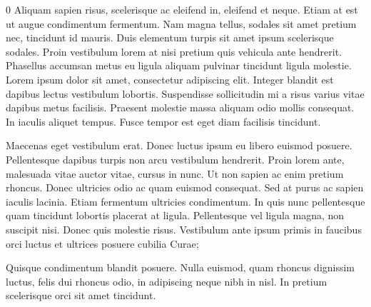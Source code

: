 \documentclass[a0]{a0poster}
\begin{document}
\framethin
\begin{area4}{0}
Aliquam sapien risus, scelerisque ac eleifend in, eleifend et neque. Etiam at est ut augue condimentum fermentum. Nam magna tellus, sodales sit amet pretium nec, tincidunt id mauris. Duis elementum turpis sit amet ipsum scelerisque sodales. Proin vestibulum lorem at nisi pretium quis vehicula ante hendrerit. Phasellus accumsan metus eu ligula aliquam pulvinar tincidunt ligula molestie. Lorem ipsum dolor sit amet, consectetur adipiscing elit. Integer blandit est dapibus lectus vestibulum lobortis. Suspendisse sollicitudin mi a risus varius vitae dapibus metus facilisis. Praesent molestie massa aliquam odio mollis consequat. In iaculis aliquet tempus. Fusce tempor est eget diam facilisis tincidunt.

Maecenas eget vestibulum erat. Donec luctus ipsum eu libero euismod posuere. Pellentesque dapibus turpis non arcu vestibulum hendrerit. Proin lorem ante, malesuada vitae auctor vitae, cursus in nunc. Ut non sapien ac enim pretium rhoncus. Donec ultricies odio ac quam euismod consequat. Sed at purus ac sapien iaculis lacinia. Etiam fermentum ultricies condimentum. In quis nunc pellentesque quam tincidunt lobortis placerat at ligula. Pellentesque vel ligula magna, non suscipit nisi. Donec quis molestie risus. Vestibulum ante ipsum primis in faucibus orci luctus et ultrices posuere cubilia Curae;

Quisque condimentum blandit posuere. Nulla euismod, quam rhoncus dignissim luctus, felis dui rhoncus odio, in adipiscing neque nibh in nisl. In pretium scelerisque orci sit amet tincidunt. 

\end{area4}
\end{document}
